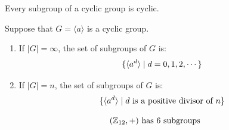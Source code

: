 \begin{frame}{}
  \begin{theorem}
    Every subgroup of a cyclic group is cyclic.
  \end{theorem}

  \pause
  \vspace{2em}
  \begin{theorem}
    Suppose that $G = \langle a \rangle$ is a cyclic group.
    
    \begin{enumerate}[(1)]
      \setlength{\itemsep}{6pt}
      \pause
      \item If $|G| = \infty$, the set of subgroups of $G$ is:
        \[
          \{\langle a^{d} \rangle \mid d = 0, 1, 2, \cdots\}
        \]
      \pause
      \item If $|G| = n$, the set of subgroups of $G$ is:
        \[
          \{\langle a^{d} \rangle \mid d \text{ is a positive divisor of } n\}
        \]
    \end{enumerate}
  \end{theorem}

  \pause
  \[
    (\mathbb{Z}_{12}, +) \text{ has 6 subgroups}
  \]
\end{frame}
